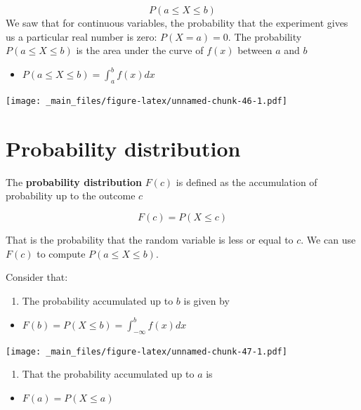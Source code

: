 \documentclass[
]{book}
\providecommand{\tightlist}{%
  \setlength{\itemsep}{0pt}\setlength{\parskip}{0pt}}
\begin{document}
\[P(a \leq X \leq b)\]
We saw that for continuous variables, the probability that the experiment gives us a particular real number is zero: \(P(X=a)=0\). The probability \(P(a \leq X \leq b)\) is the area under the curve of \(f(x)\) between \(a\) and \(b\)

\begin{itemize}
\tightlist
\item
  \(P(a \leq X \leq b) = \int_{a}^{b} f(x) dx\)
\end{itemize}

\texttt{[image: \_main\_files/figure-latex/unnamed-chunk-46-1.pdf]}

\hypertarget{probability-distribution-1}{%
\section{Probability distribution}\label{probability-distribution-1}}

The \textbf{probability distribution} \(F(c)\) is defined as the accumulation of probability up to the outcome \(c\)

\[F(c) = P(X \leq c)\]

That is the probability that the random variable is less or equal to \(c\). We can use \(F(c)\) to compute \(P(a \leq X \leq b)\).

Consider that:

\begin{enumerate}
\def\labelenumi{\arabic{enumi})}
\tightlist
\item
  The probability accumulated up to \(b\) is given by
\end{enumerate}

\begin{itemize}
\tightlist
\item
  \(F(b) = P(X \leq b)=\int_{-\infty}^bf(x)dx\)
\end{itemize}

\texttt{[image: \_main\_files/figure-latex/unnamed-chunk-47-1.pdf]}

\begin{enumerate}
\def\labelenumi{\arabic{enumi})}
\setcounter{enumi}{1}
\tightlist
\item
  That the probability accumulated up to \(a\) is
\end{enumerate}

\begin{itemize}
\tightlist
\item
  \(F(a) = P(X \leq a)\)
\end{itemize}
\end{document}
